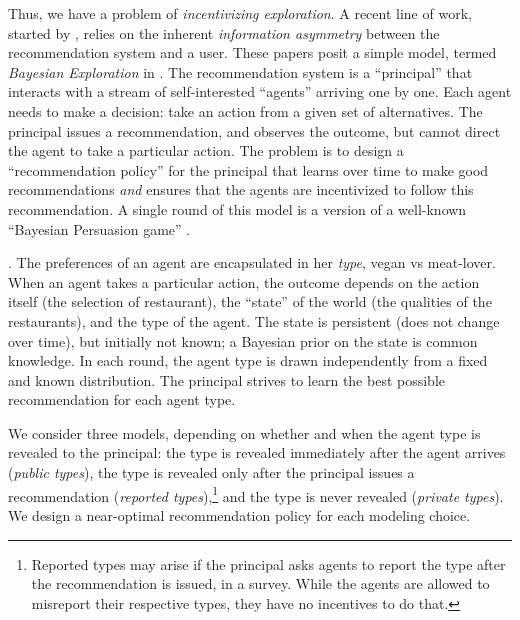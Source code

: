 Thus, we have a problem of \emph{incentivizing exploration}.
 A recent line of work, started by \cite{Kremer-JPE14}, relies on the inherent \emph{information asymmetry} between the recommendation system and a user. These papers posit a simple model, termed \emph{Bayesian Exploration} in \cite{ICexplorationGames-ec16}. The recommendation system is a ``principal'' that interacts with a stream of self-interested ``agents'' arriving one by one. Each agent needs to make a decision: take an action from a given set of alternatives. The principal issues a recommendation,
and observes the outcome, but cannot direct the agent to take a particular action. The problem is to design a ``recommendation policy'' for the principal that learns over time to make good recommendations \emph{and} ensures that the agents are incentivized to follow this recommendation.
A single round of this model is a version of a well-known ``Bayesian Persuasion game'' \cite{Kamenica-aer11}.

. The preferences of an agent are encapsulated in her {\em type}, \eg vegan vs meat-lover.
When an agent takes a particular action, the outcome depends on the action itself (\eg the selection of restaurant), the ``state'' of the world (\eg the qualities of the restaurants), and the type of the agent. The state is persistent (does not change over time), but initially not known; a Bayesian prior on the state is common knowledge. In each round, the agent type is drawn independently from a fixed and known distribution. The principal strives to learn the best possible recommendation for each agent type.

We consider three models, depending on whether and when the agent type is revealed to the principal: the type is revealed immediately after the agent arrives (\emph{public types}), the type is revealed only after the principal issues a recommendation (\emph{reported types}),\footnote{Reported types may arise if
the principal asks agents to report the type after the recommendation is issued, \eg in a survey. While the agents are allowed to misreport their respective types, they have no incentives to do that.}
and the type is never revealed (\emph{private types}).
%
We design a near-optimal recommendation policy for each modeling choice.


